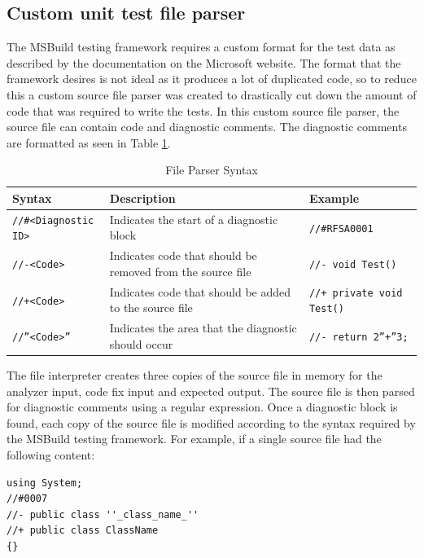 \subsection*{Custom unit test file parser}
\label{subsec:CustomUnitTestFileParser}
The MSBuild testing framework requires a custom format for the test data as described by the documentation on the Microsoft website. The format that the framework desires is not ideal as it produces a lot of duplicated code, so to reduce this a custom source file parser was created to drastically cut down the amount of code that was required to write the tests. In this custom source file parser, the source file can contain code and diagnostic comments. The diagnostic comments are formatted as seen in Table \ref{tab:FileParserSyntax}.
\begin{table}[H]
    \centering
    \caption{File Parser Syntax}
    \label{tab:FileParserSyntax}
    \begin{tabular}{|p{3.5cm}|p{8cm}|p{4cm}|}
        \hline
        Syntax&Description&Example\\
        \hline
        \texttt{//\#\textless Diagnostic ID\textgreater}&Indicates the start of a diagnostic block&\texttt{//\#RFSA0001}\\
        \texttt{//-\textless Code\textgreater}&Indicates code that should be removed from the source file&\texttt{//- void Test()}\\
        \texttt{//+\textless Code\textgreater}&Indicates code that should be added to the source file&\texttt{//+ private void Test()}\\
        \texttt{//''\textless Code\textgreater''}&Indicates the area that the diagnostic should occur&\texttt{//- return 2''+''3; }\\
        \hline
    \end{tabular}
\end{table}

The file interpreter creates three copies of the source file in memory for the analyzer input, code fix input and expected output. The source file is then parsed for diagnostic comments using a regular expression. Once a diagnostic block is found, each copy of the source file is modified according to the syntax required by the MSBuild testing framework.
For example, if a single source file had the following content:
\begin{lstlisting}[style=sharpc]
using System;
//#0007
//- public class ''_class_name_''
//+ public class ClassName
{}
\end{lstlisting}

